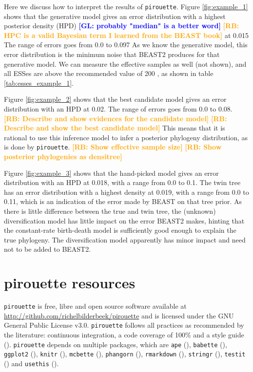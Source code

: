 \documentclass{article}
\newcommand{\giovanni}[1]{\textcolor{blue}{\textbf{[GL: #1]}}}
\newcommand{\richel}[1]{\textcolor{orange}{\textbf{[RB: #1]}}}
\begin{document}
Here we discuss how to interpret the results of \verb;pirouette;.
Figure \ref{fig:example_1} shows that the generative model 
gives an error distribution with a highest posterior density (HPD) 
\giovanni{probably "median" is a better word}
\richel{HPC is a valid Bayesian term I learned from the BEAST book}
at 0.015
The range of errors goes from 0.0 to 0.097 
As we know the generative model, 
this error distribution is the minimum noise that BEAST2 produces 
for that generative model.
We can measure the effective samples as well (not shown), 
and all ESSes are above
the recommended value of 200 \cite{drummond2015bayesian}, 
as shown in table \ref{tab:esses_example_1}.

Figure \ref{fig:example_2} shows that the best candidate model gives an error distribution 
with an HPD at 0.02. The range of errors goes from 0.0 to 0.08. 
\richel{Describe and show evidences for the candidate model}
\richel{Describe and show the best candidate model}
This means that it is rational to use this inference model to 
infer a posterior phylogeny distribution, 
as is done by \verb;pirouette;.
\richel{Show effective sample size}
\richel{Show posterior phylogenies as densitree}

Figure \ref{fig:example_3} shows that the hand-picked model 
gives an error distribution with an HPD at 0.018, 
with a range from 0.0 to 0.1.
The twin tree has an error distribution with a highest density at 0.019,
with a range from 0.0 to 0.11, which is an indication of the
error made by BEAST on that tree prior.
As there is little difference between the true and twin tree,
the (unknown) diversification model has little impact on the error
BEAST2 makes, hinting that the constant-rate birth-death model is
sufficiently good enough to explain the true phylogeny. 
The diversification model apparently has minor impact and need not to be
added to BEAST2.

\section{pirouette resources}

\verb;pirouette; is free, libre and open source software available at 
\url{http://github.com/richelbilderbeek/pirouette}
and is licensed under the GNU General Public License v3.0.
\verb;pirouette; follows all practices as recommended by the
literature: continuous integration, a code coverage of 100\%
and a style guide (\cite{style_guide}).
\verb;pirouette; depends on multiple packages, which are 
\verb;ape; (\cite{APE}), 
\verb;babette; (\cite{bilderbeek2018babette}),
\verb;ggplot2; (\cite{ggplot2}),
\verb;knitr; (\cite{knitr}),
\verb;mcbette; (\cite{mcbette}),
\verb;phangorn; (\cite{phangorn}),
\verb;rmarkdown; (\cite{rmarkdown}),
\verb;stringr; (\cite{stringr}),
\verb;testit; (\cite{testit}) and 
\verb;usethis; (\cite{usethis}).
\end{document}
